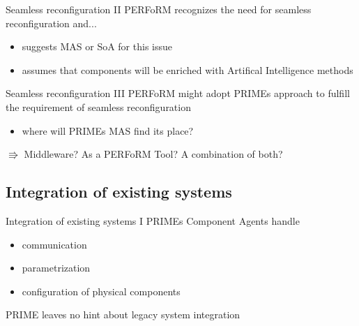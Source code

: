 \documentclass[12pt]{beamer}
\begin{document}
\begin{frame}{Seamless reconfiguration II}
	PERFoRM recognizes the need for seamless reconfiguration and...
	\newline 
	
	\begin{itemize}
		\item suggests MAS or SoA for this issue
		\newline
		
		\item assumes that components will be enriched with Artifical Intelligence methods
		\newline
	\end{itemize}
\end{frame}

\begin{frame}{Seamless reconfiguration III}
	PERFoRM might adopt PRIMEs approach to fulfill the requirement of seamless reconfiguration
	\newline
		
	\begin{itemize}
		\item where will PRIMEs MAS find its place?
		\newline
			
	\end{itemize}
	$\Rrightarrow$ Middleware? As a PERFoRM Tool? A combination of both?
\end{frame}

\subsection{Integration of existing systems}

\begin{frame}{Integration of existing systems I}
	PRIMEs Component Agents handle
	\newline
	
	\begin{itemize}
		\item communication
		\newline
		
		\item parametrization
		\newline
		
		\item configuration of physical components
		\newline
		
	\end{itemize}
	
	PRIME leaves no hint about legacy system integration
\end{frame}
\end{document}
